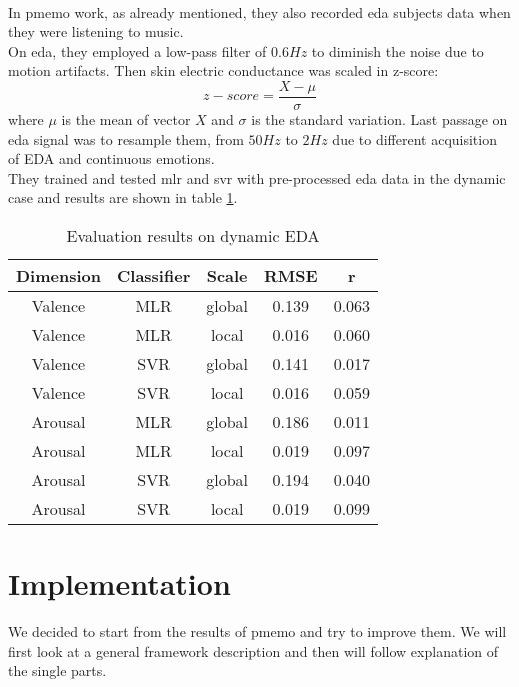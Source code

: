 \\
In \gls{pmemo} work, as already mentioned, they also recorded \gls{eda} subjects data when they were listening to music.
\\
On \gls{eda}, they employed a low-pass filter of $0.6Hz$ to diminish the noise due to motion artifacts. Then skin electric conductance was scaled in z-score:
\begin{equation}
	z-score=\dfrac{X-\mu}{\sigma}
\end{equation}
where $\mu$ is the mean of vector $X$ and $\sigma$ is the standard variation.
Last passage on \gls{eda} signal was to resample them, from $50Hz$ to $2Hz$ due to different acquisition of EDA and continuous emotions.
\\
They trained and tested \gls{mlr} and \gls{svr} with pre-processed \gls{eda} data in the dynamic case and results are shown in table \ref{table:PMEmo_results_EDA}.
\begin{table}[h!]
	\centering
	\begin{tabular}{|c|c|c|c|c|}
		\hline
		Dimension & Classifier & Scale & RMSE & r \\ [0.5ex] 
		\hline\hline Valence & MLR & global & 0.139 & 0.063 \\
		\hline Valence & MLR & local & 0.016 & 0.060 \\
		\hline Valence & SVR & global & 0.141 & 0.017 \\
		\hline Valence & SVR & local & 0.016 & 0.059 \\
		\hline Arousal & MLR & global & 0.186 & 0.011 \\
		\hline Arousal & MLR & local & 0.019 & 0.097 \\
		\hline Arousal & SVR & global & 0.194 & 0.040 \\
		\hline Arousal & SVR & local & 0.019 & 0.099 \\
		\hline
	\end{tabular}
	\caption{Evaluation results on dynamic EDA}
	\label{table:PMEmo_results_EDA}
\end{table}

\section{Implementation}
We decided to start from the results of \gls{pmemo} and try to improve them. We will first look at a general framework description and then will follow explanation of the single parts.

